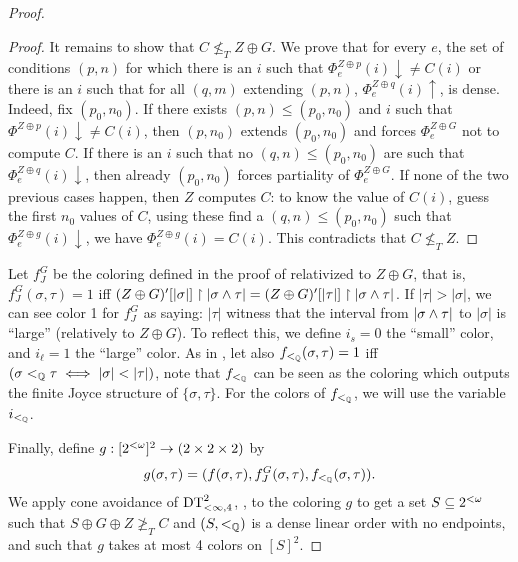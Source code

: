 \begin{proof}
\begin{proof}
  It remains to show that $C\not\leq_TZ\oplus G$. We prove that for every $e$, the set of conditions $(p,n)$ for which there is an $i$ such that $\Phi_e^{Z\oplus p}(i)\downarrow\neq C(i)$ or there is an $i$ such that for all $(q,m)$ extending $(p,n)$, $\Phi_e^{Z\oplus q}(i)\uparrow$, is dense. Indeed, fix $(p_0,n_0)$. If there exists $(p,n)\leq (p_0,n_0)$ and $i$ such that $\Phi^{Z\oplus p}(i)\downarrow\neq C(i)$, then $(p,n_0)$ extends $(p_0,n_0)$ and forces $\Phi_e^{Z\oplus G}$ not to compute $C$. If there is an $i$ such that no $(q,n)\leq (p_0,n_0)$ are such that $\Phi_e^{Z\oplus q}(i)\downarrow$, then already $(p_0, n_0)$ forces partiality of $\Phi_e^{Z\oplus G}$. If none of the two previous cases happen, then $Z$ computes $C$: to know the value of $C(i)$, guess the first $n_0$ values of $C$, using these find a $(q,n)\leq (p_0, n_0)$ such that $\Phi_e^{Z\oplus g}(i)\downarrow$, we have $\Phi_e^{Z\oplus g}(i)=C(i)$. This contradicts that $C\not\leq_T Z$.
\end{proof}
Let $f_J^G$ be the coloring defined in the proof of  relativized to $Z\oplus G$, that is, $f_J^G(\sigma,\tau)=1$ iff $(Z\oplus G)'[|\sigma|]\upharpoonright |\sigma\wedge\tau| = (Z\oplus G)'[|\tau|]\upharpoonright |\sigma\wedge\tau|$. If $|\tau|>|\sigma|$, we can see color 1 for $f_J^G$ as saying: $|\tau|$ witness that the interval from $|\sigma\wedge\tau|$ to $|\sigma|$ is ``large'' (relatively to $Z\oplus G$). To reflect this, we define $i_s=0$ the ``small'' color, and $i_\ell=1$ the ``large'' color. As in , let also $f_{<_{\mathbb{Q}}}(\sigma,\tau)=1$ iff $(\sigma\ltlex\tau\iff|\sigma|<|\tau|)$, note that $f_{<_{\mathbb{Q}}}$ can be seen as the coloring which outputs the finite Joyce structure of $\{\sigma,\tau\}$. For the colors of $f_{<_{\mathbb{Q}}}$, we will use the variable ${i_{<_{\mathbb{Q}}}}$.

Finally, define $g:[{2^{<\omega}}]^2\to(2\times2\times2)$ by
\[
g(\sigma,\tau)=(f(\sigma,\tau),f_J^G(\sigma,\tau), f_{<_{\mathbb{Q}}}(\sigma,\tau)).\]
We apply cone avoidance of $\mathrm{DT}^{2}_{<\infty,4}$, , to the coloring $g$ to get a set $S\subseteq{2^{<\omega}}$ such that $S\oplus G\oplus Z\not\geq_T C$ and $(S,<_{\mathbb{Q}})$ is a dense linear order with no endpoints, and such that $g$ takes at most 4 colors on $[S]^2$. %


\end{proof}
